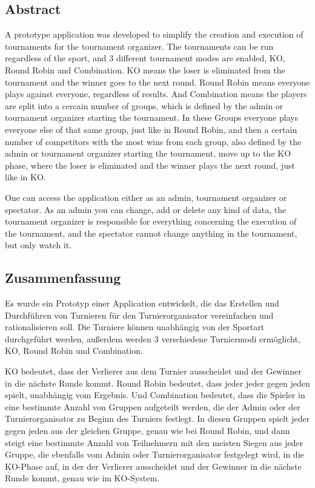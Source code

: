 \begin{spacing}{1}
    \chapter*{Abstract}
\end{spacing}
A prototype application was developed to simplify the creation and execution of tournaments for the tournament organizer. 
The tournaments can be run regardless of the sport, and  
3 different tournament modes are enabled, KO, Round Robin and Combination.
KO means the loser is eliminated from the tournament and the winner goes to the next round. Round Robin means everyone 
plays against everyone, regardless of results. And Combination means the players are split into a cercain number of groups, which is 
defined by the admin or tournament organizer starting the tournament. In these Groups everyone plays everyone else of that same group, just like 
in Round Robin, and then a certain number of competitors with the most wins from each group, also defined by the admin or tournament 
organizer starting the tournament, move up to the KO phase, where the loser is eliminated and the winner plays the next round, just like in KO.

One can access the application either as an admin, tournament organizer or spectator.
As an admin you can change, add or delete any kind of data, the tournament organizer is 
responsible for everything concerning the execution of the tournament, and the spectator 
cannot change anything in the tournament, but only watch it.
\newpage
\begin{spacing}{1}
    \chapter*{Zusammenfassung}
\end{spacing}
Es wurde ein Prototyp einer Application entwickelt, die das Erstellen und Durchführen 
von Turnieren für den Turnierorganisator vereinfachen und rationalisieren soll.
Die Turniere können unabhängig von der Sportart durchgeführt werden, außerdem 
werden 3 verschiedene Turniermodi ermöglicht, KO, Round Robin und Combination.

KO bedeutet, dass der Verlierer aus dem Turnier ausscheidet und der Gewinner in die nächste Runde kommt. Round Robin bedeutet, dass jeder 
jeder gegen jeden spielt, unabhängig vom Ergebnis. Und Combination bedeutet, dass die Spieler in eine bestimmte Anzahl von Gruppen aufgeteilt werden, 
die der Admin oder der Turnierorganisator zu Beginn des Turniers festlegt. In diesen Gruppen spielt jeder gegen jeden aus der gleichen Gruppe, genau 
wie bei Round Robin, und dann steigt eine bestimmte Anzahl von Teilnehmern mit den meisten Siegen aus jeder Gruppe, die ebenfalls vom Admin oder Turnierorganisator festgelegt wird, 
in die KO-Phase auf, in der der Verlierer ausscheidet und der Gewinner in die nächste Runde kommt, genau wie im KO-System.


